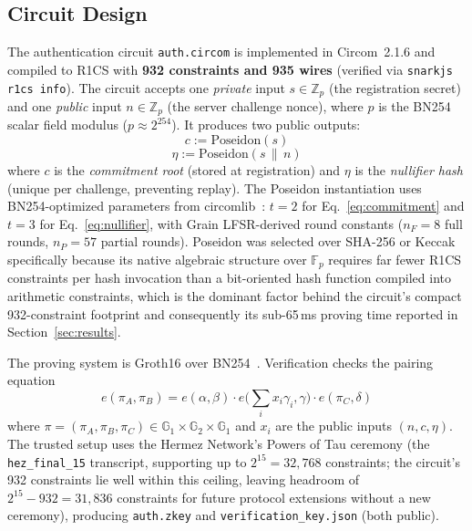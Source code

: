 \documentclass[journal,twoside,10pt]{IEEEtran}
\begin{document}
\subsection{Circuit Design}
The authentication circuit \texttt{auth.circom} is implemented in Circom~2.1.6
and compiled to R1CS with \textbf{932 constraints and 935 wires}
(verified via \texttt{snarkjs r1cs info}). The circuit accepts one
\emph{private} input $s \in \mathbb{Z}_p$ (the registration secret) and one
\emph{public} input $n \in \mathbb{Z}_p$ (the server challenge nonce), where
$p$ is the BN254 scalar field modulus ($p \approx 2^{254}$). It produces two
public outputs:
\begin{equation}
  c := \mathrm{Poseidon}(s) \label{eq:commitment}
\end{equation}
\begin{equation}
  \eta := \mathrm{Poseidon}(s \,\|\, n) \label{eq:nullifier}
\end{equation}
\noindent where $c$ is the \textit{commitment root} (stored at registration)
and $\eta$ is the \textit{nullifier hash} (unique per challenge, preventing
replay). The Poseidon instantiation uses BN254-optimized parameters from
circomlib~\cite{poseidon}: $t=2$ for Eq.~\ref{eq:commitment} and $t=3$ for
Eq.~\ref{eq:nullifier}, with Grain LFSR-derived round constants
($n_F = 8$ full rounds, $n_P = 57$ partial rounds). Poseidon was selected
over SHA-256 or Keccak specifically because its native algebraic structure
over $\mathbb{F}_p$ requires far fewer R1CS constraints per hash invocation
than a bit-oriented hash function compiled into arithmetic constraints,
which is the dominant factor behind the circuit's compact 932-constraint
footprint and consequently its sub-65\,ms proving time reported in
Section~\ref{sec:results}.

The proving system is Groth16 over BN254~\cite{groth16}. Verification
checks the pairing equation
\begin{equation}
  e(\pi_A,\pi_B) = e(\alpha,\beta)\cdot e\!\Big(\textstyle\sum_i x_i\gamma_i,\gamma\Big)\cdot e(\pi_C,\delta)
  \label{eq:groth16verify}
\end{equation}
where $\pi = (\pi_A,\pi_B,\pi_C) \in \mathbb{G}_1\times\mathbb{G}_2\times\mathbb{G}_1$
and $x_i$ are the public inputs $(n,c,\eta)$. The trusted setup
uses the Hermez Network's Powers of Tau ceremony (the \texttt{hez\_final\_15}
transcript, supporting up to $2^{15} = 32{,}768$ constraints; the circuit's
932 constraints lie well within this ceiling, leaving headroom of
$2^{15}-932 = 31{,}836$ constraints for future protocol extensions without a
new ceremony), producing \texttt{auth.zkey} and
\texttt{verification\_key.json} (both public).
\end{document}
